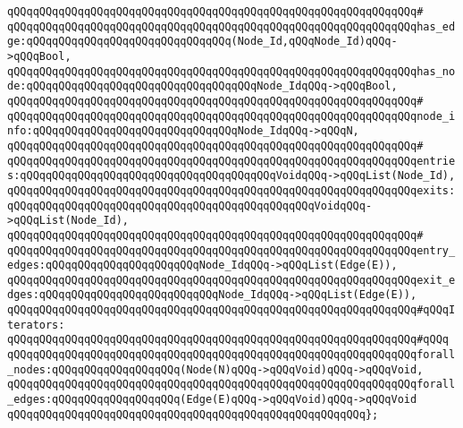 \verb|qQQqqQQqqQQqqQQqqQQqqQQqqQQqqQQqqQQqqQQqqQQqqQQqqQQqqQQqqQQqqQQq#|\newline
\verb|qQQqqQQqqQQqqQQqqQQqqQQqqQQqqQQqqQQqqQQqqQQqqQQqqQQqqQQqqQQqqQQqhas_edge:qQQqqQQqqQQqqQQqqQQqqQQqqQQqqQQq(Node_Id,qQQqNode_Id)qQQq->qQQqBool,|\newline
\verb|qQQqqQQqqQQqqQQqqQQqqQQqqQQqqQQqqQQqqQQqqQQqqQQqqQQqqQQqqQQqqQQqhas_node:qQQqqQQqqQQqqQQqqQQqqQQqqQQqqQQqqQQqNode_IdqQQq->qQQqBool,|\newline
\verb|qQQqqQQqqQQqqQQqqQQqqQQqqQQqqQQqqQQqqQQqqQQqqQQqqQQqqQQqqQQqqQQq#|\newline
\verb|qQQqqQQqqQQqqQQqqQQqqQQqqQQqqQQqqQQqqQQqqQQqqQQqqQQqqQQqqQQqqQQqnode_info:qQQqqQQqqQQqqQQqqQQqqQQqqQQqqQQqNode_IdqQQq->qQQqN,|\newline
\verb|qQQqqQQqqQQqqQQqqQQqqQQqqQQqqQQqqQQqqQQqqQQqqQQqqQQqqQQqqQQqqQQq#|\newline
\verb|qQQqqQQqqQQqqQQqqQQqqQQqqQQqqQQqqQQqqQQqqQQqqQQqqQQqqQQqqQQqqQQqentries:qQQqqQQqqQQqqQQqqQQqqQQqqQQqqQQqqQQqqQQqVoidqQQq->qQQqList(Node_Id),|\newline
\verb|qQQqqQQqqQQqqQQqqQQqqQQqqQQqqQQqqQQqqQQqqQQqqQQqqQQqqQQqqQQqqQQqexits:qQQqqQQqqQQqqQQqqQQqqQQqqQQqqQQqqQQqqQQqqQQqqQQqVoidqQQq->qQQqList(Node_Id),|\newline
\verb|qQQqqQQqqQQqqQQqqQQqqQQqqQQqqQQqqQQqqQQqqQQqqQQqqQQqqQQqqQQqqQQq#|\newline
\verb|qQQqqQQqqQQqqQQqqQQqqQQqqQQqqQQqqQQqqQQqqQQqqQQqqQQqqQQqqQQqqQQqentry_edges:qQQqqQQqqQQqqQQqqQQqqQQqNode_IdqQQq->qQQqList(Edge(E)),|\newline
\verb|qQQqqQQqqQQqqQQqqQQqqQQqqQQqqQQqqQQqqQQqqQQqqQQqqQQqqQQqqQQqqQQqexit_edges:qQQqqQQqqQQqqQQqqQQqqQQqqQQqNode_IdqQQq->qQQqList(Edge(E)),|\newline
\newline
\verb|qQQqqQQqqQQqqQQqqQQqqQQqqQQqqQQqqQQqqQQqqQQqqQQqqQQqqQQqqQQqqQQq#qQQqIterators:|\newline
\verb|qQQqqQQqqQQqqQQqqQQqqQQqqQQqqQQqqQQqqQQqqQQqqQQqqQQqqQQqqQQqqQQq#qQQq|\newline
\verb|qQQqqQQqqQQqqQQqqQQqqQQqqQQqqQQqqQQqqQQqqQQqqQQqqQQqqQQqqQQqqQQqforall_nodes:qQQqqQQqqQQqqQQqqQQq(Node(N)qQQq->qQQqVoid)qQQq->qQQqVoid,|\newline
\verb|qQQqqQQqqQQqqQQqqQQqqQQqqQQqqQQqqQQqqQQqqQQqqQQqqQQqqQQqqQQqqQQqforall_edges:qQQqqQQqqQQqqQQqqQQq(Edge(E)qQQq->qQQqVoid)qQQq->qQQqVoid|\newline
\verb|qQQqqQQqqQQqqQQqqQQqqQQqqQQqqQQqqQQqqQQqqQQqqQQqqQQqqQQq};|\newline
